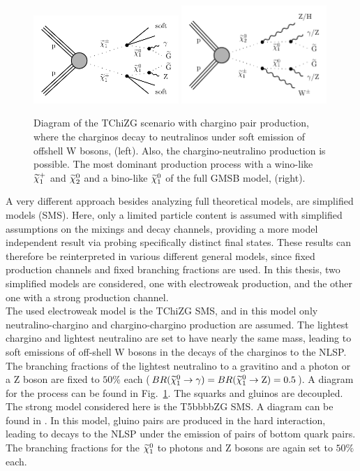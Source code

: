 \begin{figure}[hbtp]
 \centering
 \includegraphics[width=0.49\textwidth]{figures/signal/TChiNG}
 \includegraphics[width=0.49\textwidth]{figures/signal/gmsb}
 \caption{Diagram of the TChiZG scenario with chargino pair production, where the charginos decay to neutralinos under soft emission of offshell W bosons, (left). Also, the chargino-neutralino production is possible. The most dominant production process with a wino-like $\widetilde{\chi}^{+}_{1}$ and $\widetilde{\chi}^{0}_{2}$ and a bino-like $\widetilde{\chi}^{0}_{1}$ of the full GMSB model, (right).}
 \label{fig:ewkSMS}
\end{figure}



A very different approach besides analyzing full theoretical models, are simplified models (SMS)\cite{REF}. Here, only a limited particle content is assumed with simplified assumptions on the mixings and decay channels, providing a more model independent result via probing specifically distinct final states. These results can therefore be reinterpreted in various different general models, since fixed production channels and fixed branching fractions are used. In this thesis, two simplified models are considered, one with electroweak production, and the other one with a strong production channel.\\
The used electroweak model is the TChiZG SMS, and in this model only neutralino-chargino and chargino-chargino production are assumed. The lightest chargino and lightest neutralino are set to have nearly the same mass, leading to soft emissions of off-shell W bosons in the decays of the charginos to the NLSP. The branching fractions of the lightest neutralino to a gravitino and a photon or a Z boson are fixed to $50\%$ each ($BR(\widetilde{\chi}^{0}_{1}\to\gamma)=BR(\widetilde{\chi}^{0}_{1}\to\mathrm{Z})=0.5$). A diagram for the process can be found in Fig.~\ref{fig:ewkSMS}. The squarks and gluinos are decoupled.\\
The strong model considered here is the T5bbbbZG SMS. A diagram can be found in . In this model, gluino pairs are produced in the hard interaction, leading to decays to the NLSP under the emission of pairs of bottom quark pairs. The branching fractions for the $\widetilde{\chi}^{0}_{1}$ to photons and Z bosons are again set to $50\%$ each.

